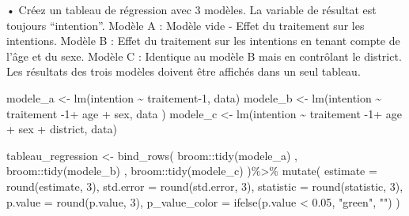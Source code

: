 \documentclass[
  letterpaper,
  DIV=11,
  numbers=noendperiod]{scrartcl}
\newenvironment{Shaded}{\begin{snugshade}}{\end{snugshade}}
\newcommand{\AttributeTok}[1]{\textcolor[rgb]{0.40,0.45,0.13}{#1}}
\newcommand{\DecValTok}[1]{\textcolor[rgb]{0.68,0.00,0.00}{#1}}
\newcommand{\FloatTok}[1]{\textcolor[rgb]{0.68,0.00,0.00}{#1}}
\newcommand{\FunctionTok}[1]{\textcolor[rgb]{0.28,0.35,0.67}{#1}}
\newcommand{\NormalTok}[1]{\textcolor[rgb]{0.00,0.23,0.31}{#1}}
\newcommand{\OtherTok}[1]{\textcolor[rgb]{0.00,0.23,0.31}{#1}}
\newcommand{\SpecialCharTok}[1]{\textcolor[rgb]{0.37,0.37,0.37}{#1}}
\newcommand{\StringTok}[1]{\textcolor[rgb]{0.13,0.47,0.30}{#1}}
\begin{document}
• Créez un tableau de régression avec 3 modèles. La variable de résultat
est toujours ``intention''. Modèle A : Modèle vide - Effet du traitement
sur les intentions. Modèle B : Effet du traitement sur les intentions en
tenant compte de l'âge et du sexe. Modèle C : Identique au modèle B mais
en contrôlant le district. Les résultats des trois modèles doivent être
affichés dans un seul tableau.

\begin{Shaded}
\begin{Highlighting}[]
\NormalTok{modele\_a }\OtherTok{\textless{}{-}} \FunctionTok{lm}\NormalTok{(intention }\SpecialCharTok{\textasciitilde{}}\NormalTok{ traitement}\DecValTok{{-}1}\NormalTok{, data)}
\NormalTok{modele\_b }\OtherTok{\textless{}{-}} \FunctionTok{lm}\NormalTok{(intention }\SpecialCharTok{\textasciitilde{}}\NormalTok{ traitement }\SpecialCharTok{{-}}\DecValTok{1}\SpecialCharTok{+}\NormalTok{ age }\SpecialCharTok{+}\NormalTok{ sex, data )}
\NormalTok{modele\_c }\OtherTok{\textless{}{-}} \FunctionTok{lm}\NormalTok{(intention }\SpecialCharTok{\textasciitilde{}}\NormalTok{ traitement }\SpecialCharTok{{-}}\DecValTok{1}\SpecialCharTok{+}\NormalTok{ age }\SpecialCharTok{+}\NormalTok{ sex }\SpecialCharTok{+}\NormalTok{ district, data)}

\NormalTok{tableau\_regression }\OtherTok{\textless{}{-}} \FunctionTok{bind\_rows}\NormalTok{(}
\NormalTok{  broom}\SpecialCharTok{::}\FunctionTok{tidy}\NormalTok{(modele\_a) ,}
\NormalTok{  broom}\SpecialCharTok{::}\FunctionTok{tidy}\NormalTok{(modele\_b) ,}
\NormalTok{  broom}\SpecialCharTok{::}\FunctionTok{tidy}\NormalTok{(modele\_c) }
\NormalTok{)}\SpecialCharTok{\%\textgreater{}\%}
  \FunctionTok{mutate}\NormalTok{(}
    \AttributeTok{estimate =} \FunctionTok{round}\NormalTok{(estimate, }\DecValTok{3}\NormalTok{),}
    \AttributeTok{std.error =} \FunctionTok{round}\NormalTok{(std.error, }\DecValTok{3}\NormalTok{),}
    \AttributeTok{statistic =} \FunctionTok{round}\NormalTok{(statistic, }\DecValTok{3}\NormalTok{),}
    \AttributeTok{p.value =} \FunctionTok{round}\NormalTok{(p.value, }\DecValTok{3}\NormalTok{),}
    \AttributeTok{p\_value\_color =} \FunctionTok{ifelse}\NormalTok{(p.value }\SpecialCharTok{\textless{}} \FloatTok{0.05}\NormalTok{, }\StringTok{"green"}\NormalTok{, }\StringTok{""}\NormalTok{)}
\NormalTok{  )}



\end{Highlighting}
\end{Shaded}
\end{document}
